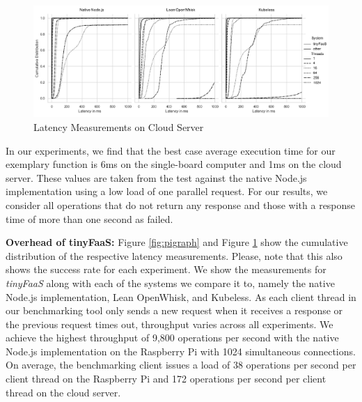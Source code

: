 \begin{figure}[ht]
  \centering
  \includegraphics[width=1\columnwidth]{fig/awsgraph.pdf}
  \caption{Latency Measurements on Cloud Server}
  \label{fig:awsgraph}
\end{figure}

In our experiments, we find that the best case average execution time for our exemplary function is 6ms on the single-board computer and 1ms on the cloud server.
These values are taken from the test against the native Node.js implementation using a low load of one parallel request.
For our results, we consider all operations that do not return any response and those with a response time of more than one second as failed.

\textbf{Overhead of tinyFaaS:} Figure \ref{fig:pigraph} and Figure \ref{fig:awsgraph} show the cumulative distribution of the respective latency measurements.
Please, note that this also shows the success rate for each experiment.
We show the measurements for \textit{tinyFaaS} along with each of the systems we compare it to, namely the native Node.js implementation, Lean OpenWhisk, and Kubeless.
As each client thread in our benchmarking tool only sends a new request when it receives a response or the previous request times out, throughput varies across all experiments.
We achieve the highest throughput of 9,800 operations per second with the native Node.js implementation on the Raspberry Pi with 1024 simultaneous connections.
On average, the benchmarking client issues a load of 38 operations per second per client thread on the Raspberry Pi and 172 operations per second per client thread on the cloud server.

